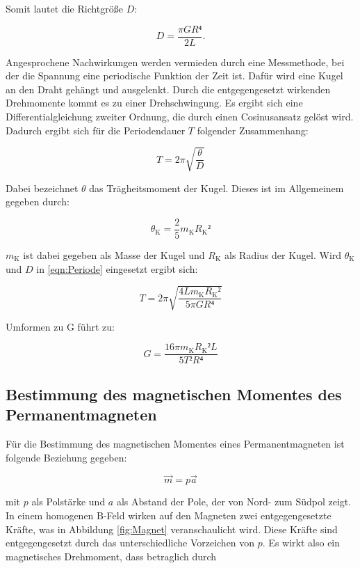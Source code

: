 Somit lautet die Richtgröße $D$:

\begin{equation}
D = \frac{\pi G R⁴}{2 L}.
\end{equation}

Angesprochene Nachwirkungen werden vermieden durch eine Messmethode, 
bei der die Spannung eine periodische Funktion der Zeit ist. Dafür 
wird eine Kugel an den Draht gehängt und ausgelenkt. Durch die entgegengesetzt
wirkenden Drehmomente kommt es zu einer Drehschwingung. 
Es ergibt sich eine Differentialgleichung zweiter Ordnung, die durch einen 
Cosinusansatz gelöst wird. Dadurch ergibt sich für die Periodendauer $T$
folgender Zusammenhang: 

\begin{equation}
T = 2\pi \sqrt{\frac{\theta}{D}}
\label{eqn:Periode}
\end{equation}

Dabei bezeichnet $\theta$ das Trägheitsmoment der Kugel. Dieses ist im 
Allgemeinem gegeben durch: 

\begin{equation*}
\theta_\text{K} = \frac{2}{5} m_\text{K}R_\text{K}²
\end{equation*}

$m_\text{K}$ ist dabei gegeben als Masse der Kugel und $R_\text{K}$ als Radius
der Kugel. Wird $\theta_\text{K}$ und $D$ in \eqref{eqn:Periode} eingesetzt ergibt sich: 

\begin{equation*}
T = 2\pi \sqrt{\frac{4Lm_\text{K}R_\text{K}²}{5\pi GR⁴}}
\end{equation*}

Umformen zu G führt zu: 

\begin{equation}
G = \frac{16\pi m_\text{K} R_\text{K}² L}{5T²R⁴}
\end{equation}

\subsection{Bestimmung des magnetischen Momentes des Permanentmagneten}

Für die Bestimmung des magnetischen Momentes eines Permanentmagneten ist 
folgende Beziehung gegeben: 

\begin{equation*}
\vec{m} = p \vec{a}
\end{equation*}

mit $p$ als Polstärke und $a$ als Abstand der Pole, der von Nord- zum Südpol 
zeigt. In einem homogenen B-Feld wirken auf den Magneten zwei entgegengesetzte
Kräfte, was in Abbildung \ref{fig:Magnet} veranschaulicht wird. Diese Kräfte sind entgegengesetzt
durch das unterschiedliche Vorzeichen von $p$. Es wirkt also ein magnetisches 
Drehmoment, dass betraglich durch

